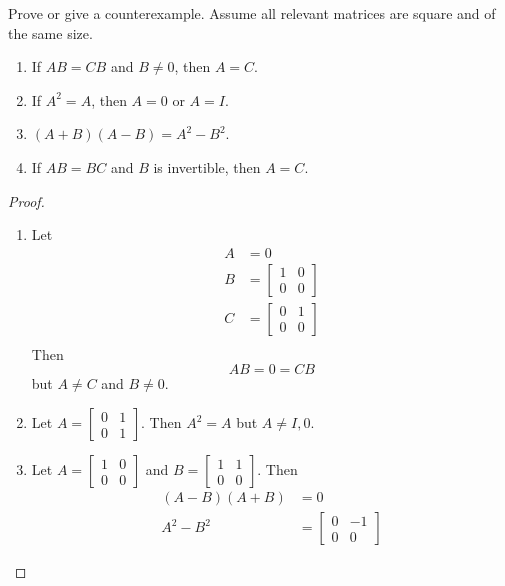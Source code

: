 \begin{exercise} \label{e1.4.8}
    Prove or give a counterexample. Assume all relevant matrices are square and of the same size.
    
    \begin{enumerate}
        \item If \( AB = CB \) and \( B \neq 0 \), then \( A = C \).
        
        \item If \( A^2 = A \), then \( A = 0 \) or \( A = I \).
        
        \item \( (A+B)(A-B) = A^2 - B^2 \).
        
        \item If \( AB = BC \) and \( B \) is invertible, then \( A = C \).
    \end{enumerate}
    
    \begin{proof}
        \begin{enumerate}
            \item Let
            \begin{align*}
                A &= 0 \\
                B &= \begin{bmatrix} 1 & 0 \\ 0 & 0 \end{bmatrix} \\
                C &= \begin{bmatrix} 0 & 1 \\ 0 & 0 \end{bmatrix} \\
            \end{align*}
            Then 
            \[ AB = 0 = CB \]
            but \( A \neq C \) and \( B \neq 0 \).
            
            \item Let \( A = \begin{bmatrix} 0 & 1 \\ 0 & 1 \end{bmatrix} \). Then \( A^2 = A \) but \( A \neq I,0 \).
            
            \item Let \( A = \begin{bmatrix} 1 & 0 \\ 0 & 0 \end{bmatrix} \) and \( B = \begin{bmatrix} 1 & 1 \\ 0 & 0 \end{bmatrix} \). Then
            \begin{align*}
                (A-B)(A+B) &= 0 \\
                A^2 - B^2 &= \begin{bmatrix} 0 & -1 \\ 0 & 0 \end{bmatrix}
            \end{align*}
            

\end{enumerate}
\end{proof}
\end{exercise}
